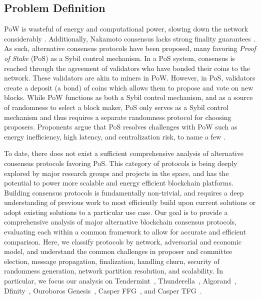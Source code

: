 \documentclass[10pt,journal,compsoc]{IEEEtran}
\begin{document}
\subsection{Problem Definition}
PoW is wasteful of energy and computational power, slowing down the network considerably \cite{CromanEtAl}. Additionally, Nakamoto consensus lacks strong finality guarantees \cite{EthPoSFAQ}. As such, alternative consensus protocols have been proposed, many favoring \emph{Proof of Stake} (PoS) \cite{Ouroboros} as a Sybil control mechanism. In a PoS system, consensus is reached through the agreement of validators who have bonded their coins to the network. These validators are akin to miners in PoW. However, in PoS, validators create a deposit (a bond) of coins which allows them to propose and vote on new blocks. While PoW functions as both a Sybil control mechanism, and as a source of randomness to select a block maker, PoS only serves as a Sybil control mechanism and thus requires a separate randomness protocol for choosing proposers. Proponents argue that PoS resolves challenges with PoW such as energy inefficiency, high latency, and centralization risk, to name a few \cite{EthPoSFAQ}. 

To date, there does not exist a sufficient comprehensive analysis of alternative consensus protocols favoring PoS. This category of protocols is being deeply explored by major research groups and projects in the space, and has the potential to power more scalable and energy efficient blockchain platforms. Building consensus protocols is fundamentally non-trivial, and requires a deep understanding of previous work to most efficiently build upon current solutions or adopt existing solutions to a particular use case. Our goal is to provide a comprehensive analysis of major alternative blockchain consensus protocols, evaluating each within a common framework to allow for accurate and efficient comparison. Here, we classify protocols by network, adversarial and economic model, and understand the common challenges in proposer and committee election, message propagation, finalization, handling churn, security of randomness generation, network partition resolution, and scalability. In particular, we focus our analysis on Tendermint~\cite{Tendermint}, Thunderella~\cite{Thunderella}, Algorand~\cite{Algorand}, Dfinity~\cite{Dfinity}, Ouroboros Genesis~\cite{Ouroboros}, Casper FFG~\cite{FFG}, and Casper TFG~\cite{TFG}.
\end{document}
